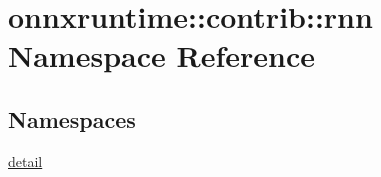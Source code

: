 \hypertarget{namespaceonnxruntime_1_1contrib_1_1rnn}{}\section{onnxruntime\+:\+:contrib\+:\+:rnn Namespace Reference}
\label{namespaceonnxruntime_1_1contrib_1_1rnn}
\subsection*{Namespaces}
\begin{DoxyCompactItemize}
\item 
 \mbox{\hyperlink{namespaceonnxruntime_1_1contrib_1_1rnn_1_1detail}{detail}}
\end{DoxyCompactItemize}
